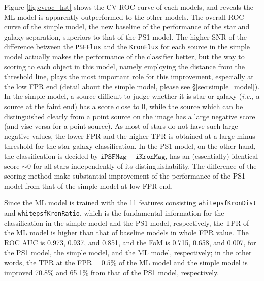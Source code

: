 \documentclass[twocolumn]{aastex62}
\begin{document}
{Figure \ref{fig:cvroc_hst} shows the CV ROC curve of each models, 
and reveals the ML model is apparently outperformed to the other models. 
The overall ROC curve of the simple model, the new baseline of the performance of the star and galaxy separation, 
superiors to that of the PS1 model. 
The higher SNR of the difference between 
the \texttt{PSFFlux} and the \texttt{KronFlux} for each source 
in the simple model actually makes the performance of the classifier better, 
but the way to scoring to each object in this model, namely employing the distance from the threshold line, 
plays the most important role for this improvement, 
especially at the low FPR end (detail about the simple model, please see \S\ref{sec:simple_model}). 
In the simple model, a source difficult to judge whether it is star or galaxy ({\it i.e.,} a source at the faint end) 
has a score close to 0, 
while the source which can be distinguished clearly from a point source on the image 
has a large negative score (and vise versa for a point source). 
As most of stars do not have such large negative values, 
the lower FPR and the higher TPR is obtained at a large minus threshold for the star-galaxy classification. 
In the PS1 model, on the other hand, the classification is decided by $\mathtt{iPSFMag} - \mathtt{iKronMag}$, 
has an (essentially) identical score $\sim$0 for all stars independently of its distinguishability. 
The difference of the scoring method make substantial improvement of the performance of the PS1 model 
from that of the simple model at low FPR end. 

Since the ML model is trained with the 11 features 
consisting \texttt{whitepsfKronDist} and \texttt{whitepsfKronRatio}, 
which is the fundamental information for the classification in the  simple model and the PS1 model, respectively, 
the TPR of the ML model is higher than that of baseline models in whole FPR value. 
The ROC AUC is 0.973, 0.937, and 0.851, 
and the FoM is 0.715, 0.658, and 0.007, 
for the PS1 model, the simple model, and the ML model, respectively; 
in the other words, the TPR at the FPR$=0.5\%$ of the ML model and the simple model 
is improved 70.8$\%$ and 65.1$\%$ from that of the PS1 model, respectively. 

}
\end{document}
